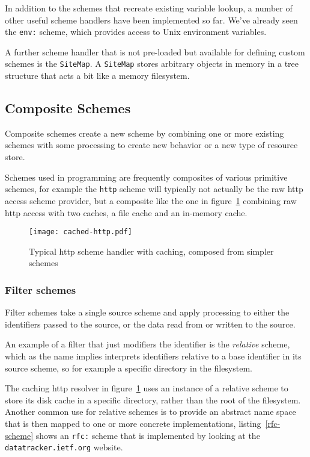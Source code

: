 \documentclass[preprint,authoryear]{llncs}
\begin{document}
In addition to the schemes that recreate existing variable lookup, a number
of other useful scheme handlers have been implemented so far.  We've
already seen the {\tt env:} scheme, which provides access to Unix
environment variables.  

A further scheme handler that is not pre-loaded but available for defining
custom schemes is the {\tt SiteMap}.  A {\tt SiteMap} stores arbitrary objects
in memory in a tree structure that acts a bit like a memory filesystem.

\subsection{Composite Schemes}
\label{compositeSchemes}
Composite schemes  create a new scheme by combining one or 
more existing schemes with some processing to create new behavior
or a new type of resource store. 

 Schemes used in programming 
are frequently composites of various primitive schemes, for example
the {\tt http} scheme will typically not actually be the raw http access
scheme provider, but a composite like the one in figure~\ref{fig:http-cached} combining
raw http access with two caches, a file cache and an in-memory cache.


\begin{figure}[htbp]
\begin{center}
\texttt{[image: cached-http.pdf]}
\caption{Typical http scheme handler with caching, composed from simpler schemes}
\label{fig:http-cached}
\end{center}
\end{figure}


\subsubsection{Filter schemes}
\label{filterschemes}
Filter schemes take a single source scheme and apply processing to either
the identifiers passed to the source, or the data read from or written to the source.

An example of a filter that just modifiers the identifier is the \emph{relative}
scheme, which as the name implies interprets identifiers relative to a base
identifier in its source scheme, so for example a specific directory in the
filesystem.  

The caching http resolver in figure~\ref{fig:http-cached} uses an instance
of a relative scheme to store its disk cache in a specific directory, rather
than the root of the filesystem.  Another common use for relative schemes
is to provide an abstract name space that is then mapped to one
or more  concrete implementations, listing~\ref{rfc-scheme} shows
an {\tt rfc:} scheme that is implemented by looking at the {\tt datatracker.ietf.org}
website.
\end{document}
